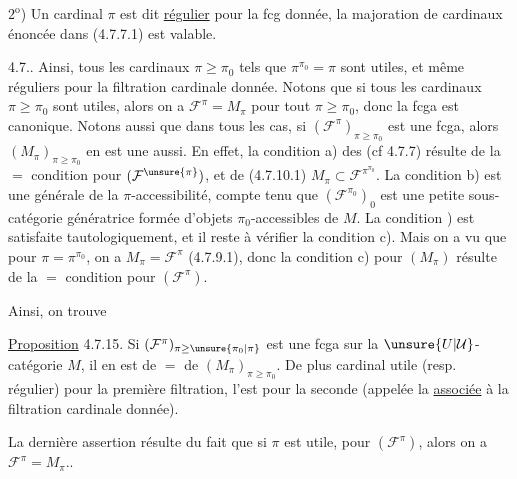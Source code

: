 $2^{\mathrm{o}}$) Un cardinal $\pi$ est dit \uline{régulier}
pour la fcg donnée,  
  la majoration de cardinaux énoncée dans
(4.7.7.1) est valable.

4.7.. Ainsi, tous les cardinaux $\pi\geq\pi_0$ tels que
$\pi^{\pi_0}=\pi$ sont utiles, et même réguliers pour
la filtration cardinale donnée. Notons
que si tous les cardinaux $\pi\geq\pi_0$ sont
utiles, alors on a $\mathcal F^\pi=M_\pi$ pour tout
$\pi\geq\pi_0$, donc la fcga est canonique. Notons
aussi que dans tous les cas, si $(\mathcal F^\pi)_{\pi\geq\pi_0}$ est
une fcga, alors $(M_\pi)_{\pi\geq\pi_0}$ en est une aussi.
En effet, la condition a) des  (cf 4.7.7) résulte de
la $=$ condition pour $(\mathcal F^{\unsure{\pi}})$, et de (4.7.10.1)
$M_\pi\subset\mathcal F^{\pi^{\pi_0}}$. La condition b) est une  
générale de la $\pi$-accessibilité, compte tenu
que $(\mathcal F^{\pi_0})_0$ est une petite sous-catégorie génératrice
formée d'objets $\pi_0$-accessibles de $M$. La condition ) est satisfaite tautologiquement, et
il reste à vérifier la condition c). Mais
on a vu que pour $\pi=\pi^{\pi_0}$, on a $M_\pi=\mathcal F^\pi$
(4.7.9.1), donc la condition c) pour $(M_\pi)$
résulte de la $=$ condition pour $(\mathcal F^\pi)$.

Ainsi, on trouve

\uline{Proposition} 4.7.15. Si $(\mathcal F^\pi)_{\pi\geq\unsure{\pi_0|\pi}}$ est une
fcga sur la $\unsure{U|\mathcal U}$-catégorie $M$, il en est
de $=$ de $(M_\pi)_{\pi\geq\pi_0}$. De plus 
cardinal utile (resp. régulier) pour la
première filtration, l'est pour la  seconde
(appelée la   \uline{associée}
à la filtration cardinale donnée).

La dernière assertion résulte du
fait que si $\pi$ est utile, pour $(\mathcal F^\pi)$, alors
on a $\mathcal F^\pi=M_\pi$..

